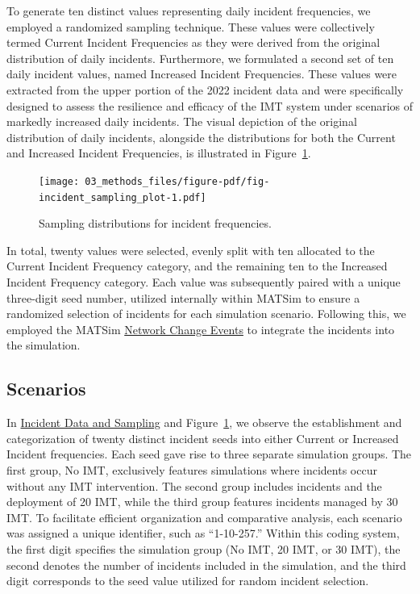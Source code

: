 \documentclass[fancy, oneside, mastersfancy, ms]{byuthesis}
\begin{document}
To generate ten distinct values representing daily incident frequencies,
we employed a randomized sampling technique. These values were
collectively termed Current Incident Frequencies as they were derived
from the original distribution of daily incidents. Furthermore, we
formulated a second set of ten daily incident values, named Increased
Incident Frequencies. These values were extracted from the upper portion
of the 2022 incident data and were specifically designed to assess the
resilience and efficacy of the IMT system under scenarios of markedly
increased daily incidents. The visual depiction of the original
distribution of daily incidents, alongside the distributions for both
the Current and Increased Incident Frequencies, is illustrated in
Figure~\ref{fig-incident_sampling_plot}.

\begin{figure}

{\centering \texttt{[image: 03\_methods\_files/figure-pdf/fig-incident\_sampling\_plot-1.pdf]}

}

\caption{\label{fig-incident_sampling_plot}Sampling distributions for
incident frequencies.}

\end{figure}

In total, twenty values were selected, evenly split with ten allocated
to the Current Incident Frequency category, and the remaining ten to the
Increased Incident Frequency category. Each value was subsequently
paired with a unique three-digit seed number, utilized internally within
MATSim to ensure a randomized selection of incidents for each simulation
scenario. Following this, we employed the MATSim
\protect\hyperlink{sec-NCE}{Network Change Events} to integrate the
incidents into the simulation.

\hypertarget{sec-scenarios}{%
\subsection{Scenarios}\label{sec-scenarios}}

In \protect\hyperlink{sec-inc_data}{Incident Data and Sampling} and
Figure~\ref{fig-incident_sampling_plot}, we observe the establishment
and categorization of twenty distinct incident seeds into either Current
or Increased Incident frequencies. Each seed gave rise to three separate
simulation groups. The first group, No IMT, exclusively features
simulations where incidents occur without any IMT intervention. The
second group includes incidents and the deployment of 20 IMT, while the
third group features incidents managed by 30 IMT. To facilitate
efficient organization and comparative analysis, each scenario was
assigned a unique identifier, such as ``1-10-257.'' Within this coding
system, the first digit specifies the simulation group (No IMT, 20 IMT,
or 30 IMT), the second denotes the number of incidents included in the
simulation, and the third digit corresponds to the seed value utilized
for random incident selection.
\end{document}
